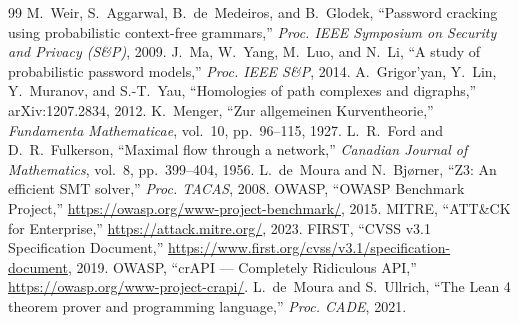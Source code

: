 \documentclass[journal]{IEEEtran}
\begin{document}
\begin{thebibliography}{99}
 M.~Weir, S.~Aggarwal, B.~de~Medeiros, and B.~Glodek,
``Password cracking using probabilistic context-free grammars,''
\emph{Proc. IEEE Symposium on Security and Privacy (S\&P)}, 2009.
 J.~Ma, W.~Yang, M.~Luo, and N.~Li,
``A study of probabilistic password models,''
\emph{Proc. IEEE S\&P}, 2014.
 A.~Grigor'yan, Y.~Lin, Y.~Muranov, and S.-T.~Yau,
``Homologies of path complexes and digraphs,''
arXiv:1207.2834, 2012.
 K.~Menger,
``Zur allgemeinen Kurventheorie,''
\emph{Fundamenta Mathematicae}, vol.~10, pp.~96--115, 1927.
 L.~R.~Ford and D.~R.~Fulkerson,
``Maximal flow through a network,''
\emph{Canadian Journal of Mathematics}, vol.~8, pp.~399--404, 1956.
 L.~de~Moura and N.~Bj{\o}rner,
``Z3: An efficient SMT solver,''
\emph{Proc. TACAS}, 2008.
 OWASP, ``OWASP Benchmark Project,''
\url{https://owasp.org/www-project-benchmark/}, 2015.
 MITRE, ``ATT\&CK for Enterprise,''
\url{https://attack.mitre.org/}, 2023.
 FIRST, ``CVSS v3.1 Specification Document,''
\url{https://www.first.org/cvss/v3.1/specification-document}, 2019.
 OWASP, ``crAPI --- Completely Ridiculous API,''
\url{https://owasp.org/www-project-crapi/}.
 L.~de~Moura and S.~Ullrich,
``The Lean 4 theorem prover and programming language,''
\emph{Proc. CADE}, 2021.
\end{thebibliography}
\end{document}
